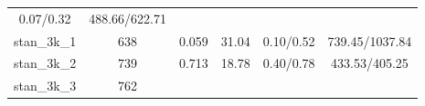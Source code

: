 \documentclass[]{article}
\begin{document}
\begin{longtable}[]{@{}cccccc@{}}
\begin{minipage}[t]{0.17\columnwidth}
0.07/0.32\strut
\end{minipage} & \begin{minipage}[t]{0.22\columnwidth}\centering\strut
488.66/622.71\strut
\end{minipage}\tabularnewline
\begin{minipage}[t]{0.12\columnwidth}\centering\strut
stan\_3k\_1\strut
\end{minipage} & \begin{minipage}[t]{0.07\columnwidth}\centering\strut
638\strut
\end{minipage} & \begin{minipage}[t]{0.12\columnwidth}\centering\strut
0.059\strut
\end{minipage} & \begin{minipage}[t]{0.14\columnwidth}\centering\strut
31.04\strut
\end{minipage} & \begin{minipage}[t]{0.17\columnwidth}\centering\strut
0.10/0.52\strut
\end{minipage} & \begin{minipage}[t]{0.22\columnwidth}\centering\strut
739.45/1037.84\strut
\end{minipage}\tabularnewline
\begin{minipage}[t]{0.12\columnwidth}\centering\strut
stan\_3k\_2\strut
\end{minipage} & \begin{minipage}[t]{0.07\columnwidth}\centering\strut
739\strut
\end{minipage} & \begin{minipage}[t]{0.12\columnwidth}\centering\strut
0.713\strut
\end{minipage} & \begin{minipage}[t]{0.14\columnwidth}\centering\strut
18.78\strut
\end{minipage} & \begin{minipage}[t]{0.17\columnwidth}\centering\strut
0.40/0.78\strut
\end{minipage} & \begin{minipage}[t]{0.22\columnwidth}\centering\strut
433.53/405.25\strut
\end{minipage}\tabularnewline
\begin{minipage}[t]{0.12\columnwidth}\centering\strut
stan\_3k\_3\strut
\end{minipage} & \begin{minipage}[t]{0.07\columnwidth}\centering\strut
762\strut
\end{minipage} & \begin{minipage}[t]{0.12\columnwidth}\centering\strut

\end{minipage}
\end{longtable}
\end{document}
